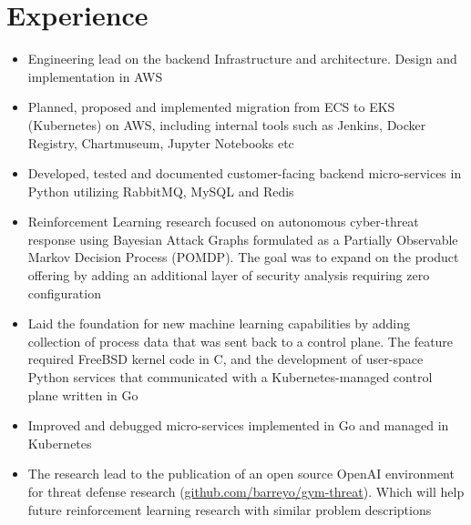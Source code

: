 \documentclass{cv_doc}
\begin{document}
\vspace{0.5cm}


\section*{Experience}


\begin{itemize}[label={\tiny\raisebox{1ex}{\textbullet}}]
  \item {Engineering lead on the backend Infrastructure and architecture. Design and implementation in AWS}
  \item {Planned, proposed and implemented migration from ECS to EKS (Kubernetes) on AWS, including internal tools such as Jenkins, Docker Registry, Chartmuseum, Jupyter Notebooks etc}
  \item {Developed, tested and documented customer-facing backend micro-services in Python utilizing RabbitMQ, MySQL and Redis}
\end{itemize}


\begin{itemize}[label={\tiny\raisebox{1ex}{\textbullet}}]
  \item {Reinforcement Learning research focused on autonomous cyber-threat response using Bayesian Attack Graphs formulated as a Partially Observable Markov Decision Process (POMDP). The goal was to expand on the product offering by adding an additional layer of security analysis requiring zero configuration}
  \item {Laid the foundation for new machine learning capabilities by adding collection of process data that was sent back to a control plane. The feature required FreeBSD kernel code in C, and the development of user-space Python services that communicated with a Kubernetes-managed control plane written in Go}
  \item {Improved and debugged micro-services implemented in Go and managed in Kubernetes}
  \item {The research lead to the publication of an open source OpenAI environment for threat defense research
  (\href{https://github.com/barreyo/gym-threat}{github.com/barreyo/gym-threat}}). Which will help future reinforcement learning research with similar problem descriptions
\end{itemize}
\end{document}

